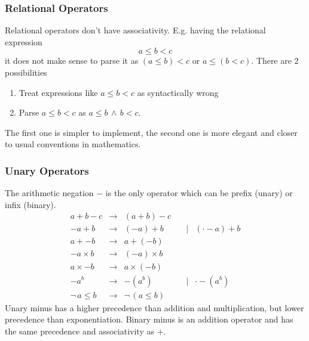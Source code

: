 \subsubsection{Relational Operators}

Relational operators don't have associativity. E.g. having the relational
expression
$$
a \le b < c
$$
%
it does not make sense to parse it as $(a \le b) < c$ or $a \le (b <
c)$. There are 2 possibilities
%
\begin{enumerate}

\item Treat expressions like $a \le b < c$ as syntactically wrong

\item Parse $a \le b < c$ as $a \le b \,\land\, b < c$.

\end{enumerate}
%
The first one is simpler to implement, the second one is more elegant and
closer to usual conventions in mathematics.




\subsubsection{Unary Operators}

The arithmetic negation $-$ is the only operator which can be prefix (unary)
or infix (binary).
$$
%
\begin{array}{lllll}

  a + b - c
  & \to
  & (a + b) - c

  \\

  - a + b
  & \to
  & (-a) + b
  & \quad\mid
  & (\cdot - a) + b

  \\

  a + -b
  & \to
  & a + (-b)

  \\

  - a \times b
  & \to
  & (-a) \times b

  \\

  a \times -b
  & \to
  & a \times (-b)

  \\

  - a^b
  & \to
  & -( a^b)
  & \quad\mid
  & \cdot - (a ^ b)

  \\

  \lnot\, a \le b
  & \to
  & \lnot\, (a \le b)
\end{array}
$$
%
Unary minus has a higher precedence than addition and multiplication, but
lower precedence than exponentiation. Binary minus is an addition
operator and has the same precedence and associativity as $+$.




